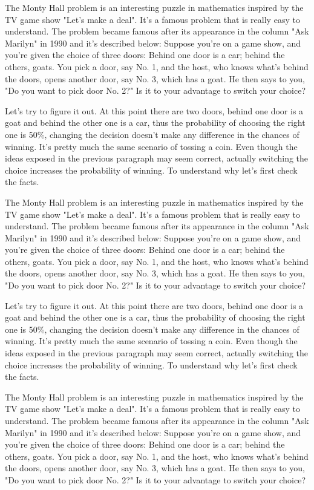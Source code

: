 \documentclass[preprint]{oscmjournal}
\begin{document}
The Monty Hall problem is an interesting puzzle in mathematics inspired by the TV  game show "Let's make a deal". It's a famous problem that is really easy to understand. The problem became famous after its appearance in the column "Ask Marilyn" in 1990 and  it's described below: Suppose you're on a game show, and you're given the choice of three doors: Behind one  door is a car; behind the others, goats. You pick a door, say No. 1, and the host, who  knows what's behind the doors, opens another door, say No. 3, which has a goat. He then  says to you, "Do you want to pick door No. 2?" Is it to your advantage to switch your choice?

Let's try to figure it out. At this point there are two doors, behind one door is a goat  and behind the other one is a car, thus the probability of choosing the right one is 50\%, changing the decision doesn't make any difference in the chances of winning. It's pretty much the same scenario of tossing a coin. Even though the ideas exposed in the previous paragraph may seem correct, actually switching the choice increases the probability of winning. To understand why let's  first check the facts.

The Monty Hall problem is an interesting puzzle in mathematics inspired by the TV  game show "Let's make a deal". It's a famous problem that is really easy to understand. The problem became famous after its appearance in the column "Ask Marilyn" in 1990 and  it's described below: Suppose you're on a game show, and you're given the choice of three doors: Behind one  door is a car; behind the others, goats. You pick a door, say No. 1, and the host, who  knows what's behind the doors, opens another door, say No. 3, which has a goat. He then  says to you, "Do you want to pick door No. 2?" Is it to your advantage to switch your choice?

Let's try to figure it out. At this point there are two doors, behind one door is a goat  and behind the other one is a car, thus the probability of choosing the right one is 50\%, changing the decision doesn't make any difference in the chances of winning. It's pretty much the same scenario of tossing a coin. Even though the ideas exposed in the previous paragraph may seem correct, actually switching the choice increases the probability of winning. To understand why let's  first check the facts.

The Monty Hall problem is an interesting puzzle in mathematics inspired by the TV  game show "Let's make a deal". It's a famous problem that is really easy to understand. The problem became famous after its appearance in the column "Ask Marilyn" in 1990 and  it's described below: Suppose you're on a game show, and you're given the choice of three doors: Behind one  door is a car; behind the others, goats. You pick a door, say No. 1, and the host, who  knows what's behind the doors, opens another door, say No. 3, which has a goat. He then  says to you, "Do you want to pick door No. 2?" Is it to your advantage to switch your choice?
\end{document}

